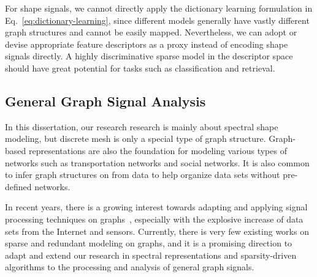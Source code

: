 For shape signals, we cannot directly apply the dictionary learning formulation in
Eq.~\ref{eq:dictionary-learning}, since different models generally have vastly different
graph structures and cannot be easily mapped. Nevertheless, we can adopt or devise appropriate
feature descriptors as a proxy instead of encoding shape signals directly. A highly discriminative
sparse model in the descriptor space should have great potential for tasks such as classification 
and retrieval.

\subsection*{General Graph Signal Analysis}
In this dissertation, our research research is mainly about spectral shape modeling, but 
discrete mesh is only a special type of graph structure. Graph-based representations are
also the foundation for modeling various types of networks such as transportation networks and 
social networks. It is also common to infer graph structures on from data
to help organize data sets without pre-defined networks. 

In recent years, there is a growing interest towards adapting and applying signal processing 
techniques on graphs~\cite{ShumanNarangFrossardEtAl2013, SandryhailaMoura2014}, especially
with the explosive increase of data sets from the Internet and sensors. Currently, there is 
very few existing works on sparse and redundant modeling on graphs, and it is
a promising direction to adapt and extend our research in spectral representations and 
sparsity-driven algorithms to the processing and analysis of general graph signals.
